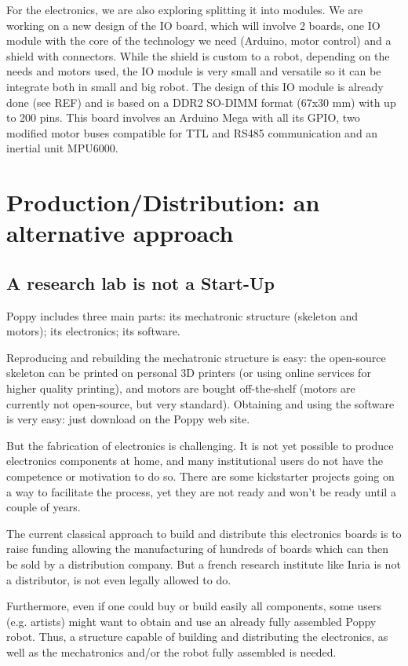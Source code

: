 For the electronics, we are also exploring splitting it into modules. We are working on a new design of the IO board, which will involve 2 boards, one IO module with the core of the technology we need (Arduino, motor control) and a shield with connectors.
While the shield is custom to a robot, depending on the needs and motors used, the IO module is very small and versatile so it can be integrate both in small and big robot.
The design of this IO module is already done (see REF) and is based on a DDR2 SO-DIMM format (67x30 mm) with up to 200 pins. This board involves an Arduino Mega with all its GPIO, two modified motor buses compatible for TTL and RS485 communication and an inertial unit MPU6000.



\section{Production/Distribution: an alternative approach} %

\subsection{A research lab is not a Start-Up} %
Poppy includes three main parts: its mechatronic structure (skeleton and motors); its electronics; its software.

Reproducing and rebuilding the mechatronic structure is easy: the open-source skeleton can be printed on personal 3D printers (or using online services for higher quality printing), and motors are bought off-the-shelf (motors are currently not open-source, but very standard). Obtaining and using the software is very easy: just download on the Poppy web site.

But the fabrication of electronics is challenging. It is not yet possible to produce electronics components at home, and many institutional users do not have the competence or motivation to do so. There are some kickstarter projects going on a way to facilitate the process, yet they are not ready and won't be ready until a couple of years.

The current classical approach to build and distribute this electronics boards is to raise funding allowing the manufacturing of hundreds of boards which can then be sold by a distribution company. But a french research institute like Inria is not a distributor,  is not even legally allowed to do.

Furthermore, even if one could buy or build easily all components, some users (e.g. artists) might want to obtain and use an already fully assembled Poppy robot. Thus, a structure capable of building and distributing the electronics, as well as the mechatronics and/or the robot fully assembled is needed.


